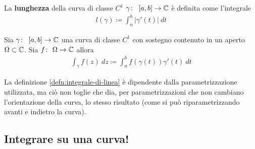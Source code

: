 \begin{definition}
	\label{defn:lunghezza-di-curva-classe-c1}
	La \textbf{lunghezza} della curva di classe $C^1$ $\gamma \colon\ \left[a,b\right] \rightarrow \mathbb{C}$ è definita come l'integrale 
	\begin{equation*}
	\begin{aligned}
	l(\gamma) \coloneqq \int_{a}^{b} |\gamma'(t)|\ dt
	\end{aligned}
	\end{equation*}
\end{definition}

\begin{definition}
	\label{defn:integrale-di-linea}
	Sia $\gamma \colon\ \left[a,b\right] \rightarrow \mathbb{C}$ una curva di classe $C^1$ con sostegno contenuto in un aperto $\Omega \subset \mathbb{C}$. Sia $f \colon\ \Omega \rightarrow \mathbb{C}$ allora
	\begin{equation*}
	\begin{aligned}
	\int_\gamma f(z)\ dz \coloneqq \int_{a}^b f(\gamma(t)) \gamma'(t) \ dt
	\end{aligned}
	\end{equation*}  
\end{definition}

\begin{remark}
	La definizione \ref{defn:integrale-di-linea} è dipendente dalla parametrizzazione utilizzata, ma ciò non toglie che dia, per parametrizzazioni che non cambiano l'orientazione della curva, lo stesso risultato (come si può riparametrizzando avanti e indietro la curva).
\end{remark}

\subsection{\textcolor{AnComp}{\textbf{Integrare su una curva!}}}

